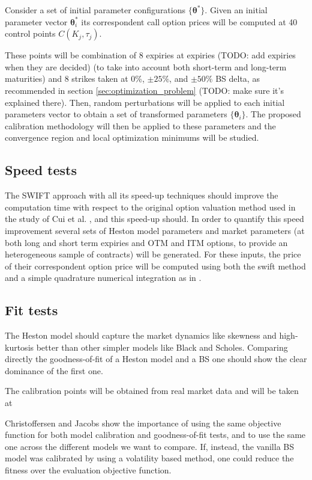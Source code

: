 \documentclass[12,twoside]{mammeTFM}
\theoremstyle{definition}
\theoremstyle{remark}
\begin{document}
Consider a set of initial parameter configurations $\{\boldsymbol{\theta}^*\}$. Given an initial parameter vector $\boldsymbol{\theta}_{i}^*$ its correspondent call option prices will be computed at 40 control points $C(K_j, \tau_j)$.

These points will be combination of 8 expiries at expiries (TODO: add expiries when they are decided) (to take into account both short-term and long-term maturities) and 8 strikes taken at 0\%, $\pm 25 \% $, and $\pm 50 \%$ BS delta, as recommended in section \ref{sec:optimization_problem} (TODO: make sure it's explained there). Then, random perturbations will be applied to each initial parameters vector to obtain a set of transformed parameters
$\{\boldsymbol{\theta}_i\}$. The proposed calibration methodology will then be applied to these parameters and the convergence region and local optimization minimums will be studied.


\subsection{Speed tests}
The SWIFT approach with all its speed-up techniques should improve the computation time with respect to the original option valuation method used in the study of Cui et al. \cite{cui17}, and this speed-up should. In order to quantify this speed improvement several sets of Heston model parameters and market parameters (at both long and short term expiries and OTM and ITM options, to provide an heterogeneous sample of contracts) will be generated. For these inputs, the price of their correspondent option price will be computed using both the swift method and a simple quadrature numerical integration as in \cite{cui17}.

\subsection{Fit tests}
The Heston model should capture the market dynamics like skewness and high-kurtosis better than other simpler models like Black and Scholes. Comparing directly the goodness-of-fit of a Heston model and a BS one should show the clear dominance of the first one.

The calibration points will be obtained from real market data and will be taken at 

Christoffersen and Jacobs \cite{chr02} show the importance of using the same objective function for both model calibration and goodness-of-fit tests, and to use the same one across the different models we want to compare. If, instead, the vanilla BS model was calibrated by using a volatility based method, one could reduce the fitness over the evaluation objective function.
\end{document}
